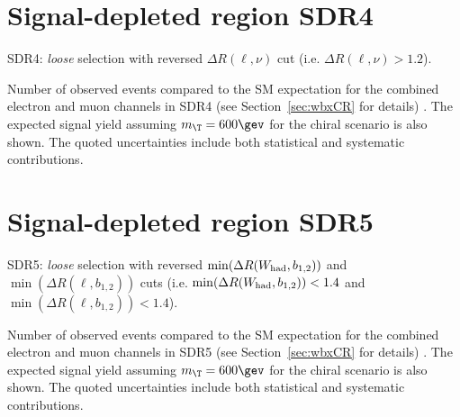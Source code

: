 \clearpage

%


\clearpage

\section{Signal-depleted region SDR4}
\label{sec:DataMC_CR3}

SDR4: {\sl loose} selection with reversed $\Delta R(\ell,\nu)$ cut (i.e. $\Delta R(\ell,\nu)>1.2$).

\begin{table}[h!]
\begin{center}

\caption{\small{Number of observed events compared to the SM expectation for
the combined electron and muon channels in SDR4 (see Section~\ref{sec:wbxCR} for details) . 
The expected signal yield assuming $m_{\T}=600\gev$ for the chiral scenario is also shown. 
The quoted uncertainties include both statistical and systematic contributions.}}
\label{tab:CR3_1W_evtable}
\end{center}
\end{table}

\clearpage

%


\clearpage

\section{Signal-depleted region SDR5}
\label{sec:DataMC_CR4}

SDR5: {\sl loose} selection with reversed $\min(\Delta R(W_{\rm had}, b_{1,2}))$ and $\min(\Delta R(\ell, b_{1,2}))$ cuts 
(i.e. $\min(\Delta R(W_{\rm had}, b_{1,2}))<1.4$ and $\min(\Delta R(\ell, b_{1,2}))<1.4$).

\begin{table}[h!]
\begin{center}

\caption{\small{Number of observed events compared to the SM expectation for
the combined electron and muon channels in SDR5 (see Section~\ref{sec:wbxCR} for details) . 
The expected signal yield assuming $m_{\T}=600\gev$ for the chiral scenario is also shown. 
The quoted uncertainties include both statistical and systematic contributions.}}
\label{tab:CR4_1W_evtable}
\end{center}
\end{table}

